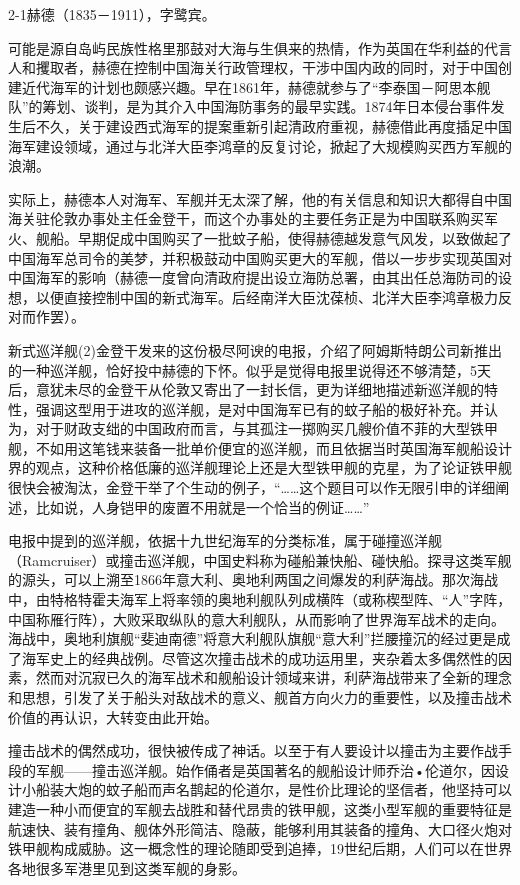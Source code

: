 \documentclass[12pt,UTF8]{ctexbook}
\begin{document}
2-1赫德（1835－1911），字鹭宾。

可能是源自岛屿民族性格里那鼓对大海与生俱来的热情，作为英国在华利益的代言人和攫取者，赫德在控制中国海关行政管理权，干涉中国内政的同时，对于中国创建近代海军的计划也颇感兴趣。早在1861年，赫德就参与了“李泰国－阿思本舰队”的筹划、谈判，是为其介入中国海防事务的最早实践。1874年日本侵台事件发生后不久，关于建设西式海军的提案重新引起清政府重视，赫德借此再度插足中国海军建设领域，通过与北洋大臣李鸿章的反复讨论，掀起了大规模购买西方军舰的浪潮。

实际上，赫德本人对海军、军舰并无太深了解，他的有关信息和知识大都得自中国海关驻伦敦办事处主任金登干，而这个办事处的主要任务正是为中国联系购买军火、舰船。早期促成中国购买了一批蚊子船，使得赫德越发意气风发，以致做起了中国海军总司令的美梦，并积极鼓动中国购买更大的军舰，借以一步步实现英国对中国海军的影响（赫德一度曾向清政府提出设立海防总署，由其出任总海防司的设想，以便直接控制中国的新式海军。后经南洋大臣沈葆桢、北洋大臣李鸿章极力反对而作罢）。

新式巡洋舰(2)金登干发来的这份极尽阿谀的电报，介绍了阿姆斯特朗公司新推出的一种巡洋舰，恰好投中赫德的下怀。似乎是觉得电报里说得还不够清楚，5天后，意犹未尽的金登干从伦敦又寄出了一封长信，更为详细地描述新巡洋舰的特性，强调这型用于进攻的巡洋舰，是对中国海军已有的蚊子船的极好补充。并认为，对于财政支绌的中国政府而言，与其孤注一掷购买几艘价值不菲的大型铁甲舰，不如用这笔钱来装备一批单价便宜的巡洋舰，而且依据当时英国海军舰船设计界的观点，这种价格低廉的巡洋舰理论上还是大型铁甲舰的克星，为了论证铁甲舰很快会被淘汰，金登干举了个生动的例子，“……这个题目可以作无限引申的详细阐述，比如说，人身铠甲的废置不用就是一个恰当的例证……”

电报中提到的巡洋舰，依据十九世纪海军的分类标准，属于碰撞巡洋舰（Ramcruiser）或撞击巡洋舰，中国史料称为碰船兼快船、碰快船。探寻这类军舰的源头，可以上溯至1866年意大利、奥地利两国之间爆发的利萨海战。那次海战中，由特格特霍夫海军上将率领的奥地利舰队列成横阵（或称楔型阵、“人”字阵，中国称雁行阵），大败采取纵队的意大利舰队，从而影响了世界海军战术的走向。海战中，奥地利旗舰“斐迪南德”将意大利舰队旗舰“意大利”拦腰撞沉的经过更是成了海军史上的经典战例。尽管这次撞击战术的成功运用里，夹杂着太多偶然性的因素，然而对沉寂已久的海军战术和舰船设计领域来讲，利萨海战带来了全新的理念和思想，引发了关于船头对敌战术的意义、舰首方向火力的重要性，以及撞击战术价值的再认识，大转变由此开始。

撞击战术的偶然成功，很快被传成了神话。以至于有人要设计以撞击为主要作战手段的军舰——撞击巡洋舰。始作俑者是英国著名的舰船设计师乔治•伦道尔，因设计小船装大炮的蚊子船而声名鹊起的伦道尔，是性价比理论的坚信者，他坚持可以建造一种小而便宜的军舰去战胜和替代昂贵的铁甲舰，这类小型军舰的重要特征是航速快、装有撞角、舰体外形简洁、隐蔽，能够利用其装备的撞角、大口径火炮对铁甲舰构成威胁。这一概念性的理论随即受到追捧，19世纪后期，人们可以在世界各地很多军港里见到这类军舰的身影。
\end{document}
